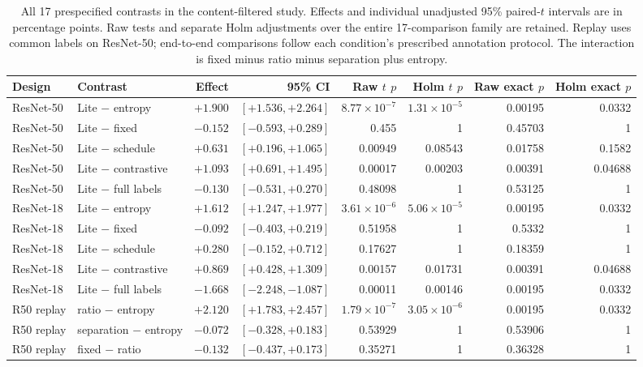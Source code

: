 \documentclass[10pt,a4paper,twocolumn]{article}
\begin{document}
\begin{table}[tbp]
\caption{All 17 prespecified contrasts in the content-filtered study.
Effects and individual unadjusted 95\% paired-$t$ intervals are in
percentage points. Raw tests and separate Holm adjustments over the
entire 17-comparison family are retained. Replay uses common labels
on ResNet-50; end-to-end comparisons follow each condition's prescribed
annotation protocol.
The interaction is fixed minus ratio minus separation plus entropy.}
\label{tab:solid_contrasts}
\centering\footnotesize
\begin{tabular*}{\textwidth}{@{\extracolsep{\fill}}llrrrrrr@{}}
\toprule
Design & Contrast & Effect & 95\% CI & Raw $t$ $p$ & Holm $t$ $p$ & Raw exact $p$ & Holm exact $p$ \\
\midrule
ResNet-50 & Lite $-$ entropy & $+1.900$ & $[+1.536,+2.264]$ & $8.77\!\times\!10^{-7}$ & $1.31\!\times\!10^{-5}$ & 0.00195 & 0.0332 \\
ResNet-50 & Lite $-$ fixed & $-0.152$ & $[-0.593,+0.289]$ & 0.455 & 1 & 0.45703 & 1 \\
ResNet-50 & Lite $-$ schedule & $+0.631$ & $[+0.196,+1.065]$ & 0.00949 & 0.08543 & 0.01758 & 0.1582 \\
ResNet-50 & Lite $-$ contrastive & $+1.093$ & $[+0.691,+1.495]$ & 0.00017 & 0.00203 & 0.00391 & 0.04688 \\
ResNet-50 & Lite $-$ full labels & $-0.130$ & $[-0.531,+0.270]$ & 0.48098 & 1 & 0.53125 & 1 \\
\midrule
ResNet-18 & Lite $-$ entropy & $+1.612$ & $[+1.247,+1.977]$ & $3.61\!\times\!10^{-6}$ & $5.06\!\times\!10^{-5}$ & 0.00195 & 0.0332 \\
ResNet-18 & Lite $-$ fixed & $-0.092$ & $[-0.403,+0.219]$ & 0.51958 & 1 & 0.5332 & 1 \\
ResNet-18 & Lite $-$ schedule & $+0.280$ & $[-0.152,+0.712]$ & 0.17627 & 1 & 0.18359 & 1 \\
ResNet-18 & Lite $-$ contrastive & $+0.869$ & $[+0.428,+1.309]$ & 0.00157 & 0.01731 & 0.00391 & 0.04688 \\
ResNet-18 & Lite $-$ full labels & $-1.668$ & $[-2.248,-1.087]$ & 0.00011 & 0.00146 & 0.00195 & 0.0332 \\
\midrule
R50 replay & ratio $-$ entropy & $+2.120$ & $[+1.783,+2.457]$ & $1.79\!\times\!10^{-7}$ & $3.05\!\times\!10^{-6}$ & 0.00195 & 0.0332 \\
R50 replay & separation $-$ entropy & $-0.072$ & $[-0.328,+0.183]$ & 0.53929 & 1 & 0.53906 & 1 \\
R50 replay & fixed $-$ ratio & $-0.132$ & $[-0.437,+0.173]$ & 0.35271 & 1 & 0.36328 & 1 \\

\end{tabular*}
\end{table}
\end{document}
